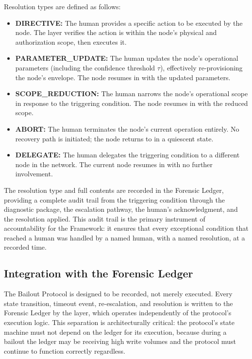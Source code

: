 \begin{definition}
\bigskip
Resolution types are defined as follows:

\begin{itemize}
\item \textbf{DIRECTIVE:} The human provides a specific action to be executed by the node. The \bounds{} layer verifies the action is within the node's physical and authorization scope, then executes it.
\item \textbf{PARAMETER\_UPDATE:} The human updates the node's operational parameters (including the confidence threshold $\tau$), effectively re-provisioning the node's envelope. The node resumes in  with the updated parameters.
\item \textbf{SCOPE\_REDUCTION:} The human narrows the node's operational scope in response to the triggering condition. The node resumes in  with the reduced scope.
\item \textbf{ABORT:} The human terminates the node's current operation entirely. No recovery path is initiated; the node returns to  in a quiescent state.
\item \textbf{DELEGATE:} The human delegates the triggering condition to a different node in the network. The current node resumes in  with no further involvement.
\end{itemize}

The resolution type and full contents are recorded in the Forensic Ledger, providing a complete audit trail from the triggering condition through the diagnostic package, the escalation pathway, the human's acknowledgment, and the resolution applied. This audit trail is the primary instrument of accountability for the \bxthree{} Framework: it ensures that every exceptional condition that reached a human was handled by a named human, with a named resolution, at a recorded time.

\subsection{Integration with the Forensic Ledger}
\label{sec:ledger-integration}

The Bailout Protocol is designed to be recorded, not merely executed. Every state transition, timeout event, re-escalation, and resolution is written to the Forensic Ledger by the \fact{} layer, which operates independently of the protocol's execution logic. This separation is architecturally critical: the protocol's state machine must not depend on the ledger for its execution, because during a bailout the ledger may be receiving high write volumes and the protocol must continue to function correctly regardless.


\end{definition}
